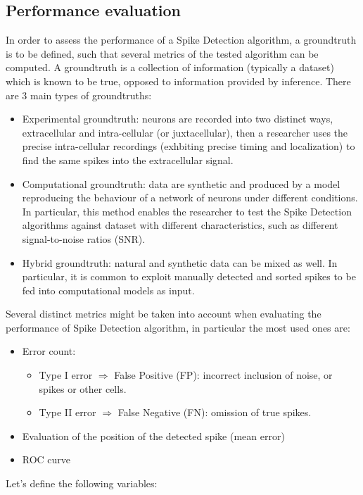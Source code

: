\subsection{Performance evaluation}
In order to assess the performance of a Spike Detection algorithm, a groundtruth
is to be defined, such that several metrics of the tested algorithm can be
computed. A groundtruth is a collection of information (typically a dataset)
which is known to be true, opposed to information provided by inference.
There are 3 main types of groundtruths:
\begin{itemize}
    \item Experimental groundtruth: neurons are recorded into two distinct ways,
    extracellular and intra-cellular (or juxtacellular), then a researcher uses
    the precise intra-cellular recordings (exhbiting precise timing and
    localization) to find the same spikes into the extracellular signal.
    \item Computational groundtruth: data are synthetic and produced by a
    model reproducing the behaviour of a network of neurons under different
    conditions. In particular, this method enables the researcher to test the
    Spike Detection algorithms against dataset with different characteristics,
    such as different signal-to-noise ratios (SNR).
    \item Hybrid groundtruth: natural and synthetic data can be mixed as well. In
    particular, it is common to exploit manually detected and sorted spikes to be
    fed into computational models as input.
\end{itemize}
Several distinct metrics might be taken into account when evaluating the
performance of Spike Detection algorithm, in particular the most used ones are:
\begin{itemize}
    \item Error count:
    \begin{itemize}
        \item Type I error \(\Rightarrow\) False Positive (FP): incorrect
        inclusion of noise, or spikes or other cells.
        \item Type II error \(\Rightarrow\) False Negative (FN): omission of
        true spikes.
    \end{itemize}
    \item Evaluation of the position of the detected spike (mean error)
    \item ROC curve
\end{itemize}
Let's define the following variables:
